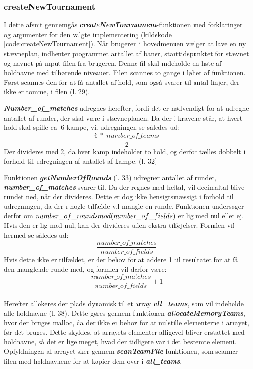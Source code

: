 \subsubsection{createNewTournament}
I dette afsnit gennemgås \textbf{\textit{createNewTournament}}-funktionen med forklaringer og argumenter for den valgte implementering (kildekode \ref{code:createNewTournament}). Når brugeren i hovedmenuen vælger at lave en ny stævneplan, indhenter programmet antallet af baner, starttidspunktet for stævnet og navnet på input-filen fra brugeren. Denne fil skal indeholde en liste af holdnavne med tilhørende niveauer. Filen scannes to gange i løbet af funktionen. Først scannes den for at få antallet af hold, som også svarer til antal linjer, der ikke er tomme, i filen (l. 29).
\par
\textbf{\textit{Number\_of\_matches}} udregnes herefter, fordi det er nødvendigt for at udregne antallet af runder, der skal være i stævneplanen. Da der i kravene står, at hvert hold skal spille ca. 6 kampe, vil udregningen se således ud:
\[\frac{6\ * \ number\_of\_teams}{2}\]
Der divideres med 2, da hver kamp indeholder to hold, og derfor tælles dobbelt i forhold til udregningen af antallet af kampe. (l. 32)
\par
Funktionen \textbf{\textit{getNumberOfRounds}} (l. 33) udregner antallet af runder, \textbf{\textit{number\_of\_matches}} svarer til. Da der regnes med heltal, vil decimaltal blive rundet ned, når der divideres. Dette er dog ikke hensigtsmæssigt i forhold til udregningen, da der i nogle tilfælde vil mangle en runde. Funktionen undersøger derfor om $number\_of\_rounds \\ mod(number\_of\_fields)$ er lig med nul eller ej. Hvis den er lig med nul, kan der divideres uden ekstra tilføjelser. Formlen vil hermed se således ud:
\[\frac{number\_of\_matches}{number\_of\_fields}\]
Hvis dette ikke er tilfældet, er der behov for at addere 1 til resultatet for at få den manglende runde med, og formlen vil derfor være:
\[\frac{number\_of\_matches}{number\_of\_fields} + 1\]
\\
Herefter allokeres der plads dynamisk til et array \textbf{\textit{all\_teams}}, som vil indeholde alle holdnavne (l. 38). Dette gøres gennem funktionen \textbf{\textit{allocateMemoryTeams}}, hvor der bruges malloc, da der ikke er behov for at nulstille elementerne i arrayet, før det bruges. Dette skyldes, at arrayets elementer alligevel bliver erstattet med holdnavne, så det er lige meget, hvad der tidligere var i det bestemte element. Opfyldningen af arrayet sker gennem \textbf{\textit{scanTeamFile}} funktionen, som scanner filen med holdnavnene for at kopier dem over i \textbf{\textit{all\_teams}}.
